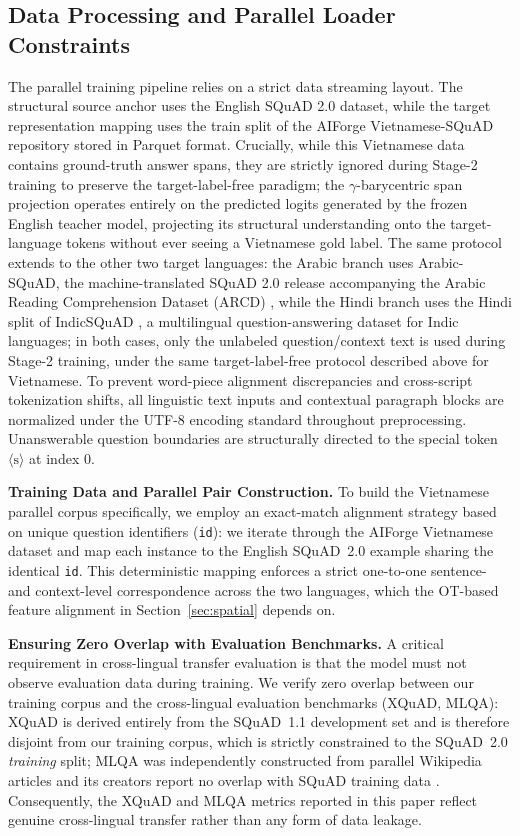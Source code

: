 \documentclass[11pt]{article}
\begin{document}
\subsection{Data Processing and Parallel Loader Constraints}
The parallel training pipeline relies on a strict data streaming layout. The structural source anchor uses the English SQuAD 2.0 dataset, while the target representation mapping uses the train split of the AIForge Vietnamese-SQuAD repository stored in Parquet format. Crucially, while this Vietnamese data contains ground-truth answer spans, they are strictly ignored during Stage-2 training to preserve the target-label-free paradigm; the $\gamma$-barycentric span projection operates entirely on the predicted logits generated by the frozen English teacher model, projecting its structural understanding onto the target-language tokens without ever seeing a Vietnamese gold label. The same protocol extends to the other two target languages: the Arabic branch uses Arabic-SQuAD, the machine-translated SQuAD 2.0 release accompanying the Arabic Reading Comprehension Dataset (ARCD) \citep{mozannar-etal-2019-neural}, while the Hindi branch uses the Hindi split of IndicSQuAD \citep{endait2025indicsquadcomprehensivemultilingualquestion}, a multilingual question-answering dataset for Indic languages; in both cases, only the unlabeled question/context text is used during Stage-2 training, under the same target-label-free protocol described above for Vietnamese. To prevent word-piece alignment discrepancies and cross-script tokenization shifts, all linguistic text inputs and contextual paragraph blocks are normalized under the UTF-8 encoding standard throughout preprocessing. Unanswerable question boundaries are structurally directed to the special token $\langle\text{s}\rangle$ at index 0.

\textbf{Training Data and Parallel Pair Construction.} To build the Vietnamese parallel corpus specifically, we employ an exact-match alignment strategy based on unique question identifiers (\texttt{id}): we iterate through the AIForge Vietnamese dataset and map each instance to the English SQuAD~2.0 example sharing the identical \texttt{id}. This deterministic mapping enforces a strict one-to-one sentence- and context-level correspondence across the two languages, which the OT-based feature alignment in Section~\ref{sec:spatial} depends on.

\textbf{Ensuring Zero Overlap with Evaluation Benchmarks.} A critical requirement in cross-lingual transfer evaluation is that the model must not observe evaluation data during training. We verify zero overlap between our training corpus and the cross-lingual evaluation benchmarks (XQuAD, MLQA): XQuAD is derived entirely from the SQuAD~1.1 development set \citep{artetxe-etal-2020-cross} and is therefore disjoint from our training corpus, which is strictly constrained to the SQuAD~2.0 \emph{training} split; MLQA was independently constructed from parallel Wikipedia articles and its creators report no overlap with SQuAD training data \citep{lewis-etal-2020-mlqa}. Consequently, the XQuAD and MLQA metrics reported in this paper reflect genuine cross-lingual transfer rather than any form of data leakage.
\end{document}
